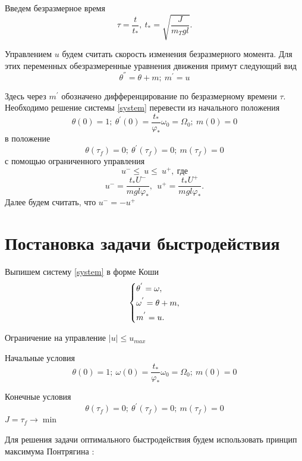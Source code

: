 \documentclass[a4paper,12pt, openany]{book}
\theoremstyle{plain} %
\theoremstyle{definition} %
\theoremstyle{remark} %
\numberwithin{equation}{chapter}
\begin{document}
{Введем безразмерное время
\[
    \tau=\frac{t}{t_\ast},\ t_\ast=\sqrt{\frac{J}{m_Tgl}}.
\]

Управлением $u$ будем считать скорость изменения безразмерного
момента. Для этих переменных обезразмеренные   уравнения движения
примут следующий вид
\begin{equation}\label{system}
    \theta^{''}=\theta+m;\ m^{'}=u
\end{equation}

Здесь через $m^{'}$ обозначено дифференцирование по
безразмерному времени $\tau$. Необходимо решение системы \eqref{system}
перевести из начального положения
\[
    \theta(0)=1;\ \theta^{'}(0)=\frac{t_\ast}{\varphi_\ast}\omega_0=\Omega_0;\ m(0)=0
\]
в положение
\[
    \theta(\tau_f)=0;\ \theta^{'}(\tau_f)=0;\ m(\tau_f)=0
\]
с помощью ограниченного управления
\[
    u^-\leqslant\ u\leqslant\ u^+,\ \text{где}
\]
\[
    u^-=\frac{t_\ast U^-}{mgl\varphi_\ast },\ \ u^+=\frac{t_\ast U^+}{mgl\varphi_\ast}.
\]
Далее будем считать, что $u^-=-u^+$

\section{Постановка задачи быстродействия}

Выпишем систему \eqref{system} в форме Коши
\begin{equation}\label{koshisystem}
    \left\{ {\begin{aligned}
                 & \theta^{'} = \omega , \hfill   \\
                 & \omega^{'} = \theta+m , \hfill \\
                 & m^{'} = u . \hfill             \\
            \end{aligned}} \right.
\end{equation}

Ограничение на управление $|u|\leqslant u_{max}$

Начальные условия
\[
    \theta(0)=1;\ \omega(0)=\frac{t_\ast}{\varphi_\ast}\omega_0=\Omega_0;\ m(0)=0
\]

Конечные условия
\[
    \theta(\tau_f)=0;\ \theta^{'}(\tau_f)=0;\ m(\tau_f)=0
\]
$J=\tau_f\to \min$

Для решения задачи оптимального быстродействия будем использовать принцип максимума Понтрягина \cite{Optimal}:

}
\end{document}

